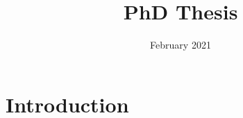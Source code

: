 \documentclass{article}
\title{PhD Thesis}
\author{ }
\date{February 2021}
\begin{document}
\maketitle

\section{Introduction}
\end{document}
